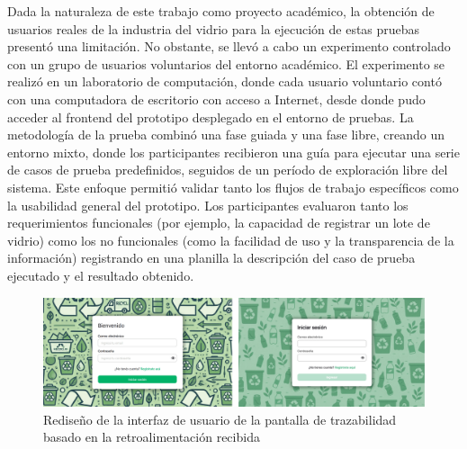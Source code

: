 Dada la naturaleza de este trabajo como proyecto académico, la obtención de usuarios reales de la industria del vidrio para la ejecución de estas pruebas presentó una limitación. No obstante, se llevó a cabo un experimento controlado con un grupo de usuarios voluntarios del entorno académico. El experimento se realizó en un laboratorio de computación, donde cada usuario voluntario contó con una computadora de escritorio con acceso a Internet, desde donde pudo acceder al frontend del prototipo desplegado en el entorno de pruebas. La metodología de la prueba combinó una fase guiada y una fase libre, creando un entorno mixto, donde los participantes recibieron una guía para ejecutar una serie de casos de prueba predefinidos, seguidos de un período de exploración libre del sistema. Este enfoque permitió validar tanto los flujos de trabajo específicos como la usabilidad general del prototipo. Los participantes evaluaron tanto los requerimientos funcionales (por ejemplo, la capacidad de registrar un lote de vidrio) como los no funcionales (como la facilidad de uso y la transparencia de la información) registrando en una planilla la descripción del caso de prueba ejecutado y el resultado obtenido.

\begin{figure}[!htb]
\centering
\includegraphics[width=\textwidth]{Figures/uat-ui-redesign.png}
\caption{Rediseño de la interfaz de usuario de la pantalla de trazabilidad basado en la retroalimentación recibida}
\label{fig:uat-ui-redesign}
\end{figure}

